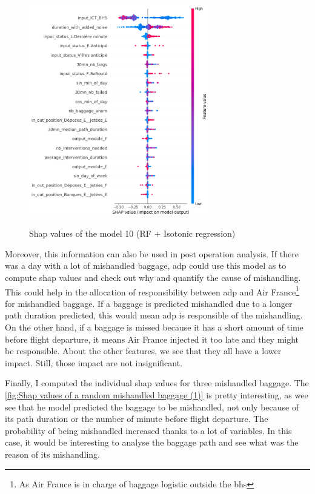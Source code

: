 \documentclass[12pt]{article}
\begin{document}
\FloatBarrier
\begin{figure}[h]
    \centering
    \includegraphics[width=0.7\textwidth]{shap values.png}\\
    \caption{Shap values of the model 10 (RF + Isotonic regression)}
    \label{fig:Shap values}
\end{figure}
\FloatBarrier

Moreover, this information can also be used in post operation analysis. If there was a day with a lot of mishandled baggage, \acrshort{adp} could use this model as to compute shap values and check out why and quantify the cause of mishandling. This could help in the allocation of responsibility between \acrshort{adp} and Air France\footnote{As Air France is in charge of baggage logistic outside the \acrshort{bhs}} for mishandled baggage. If a baggage is predicted mishandled due to a longer path duration predicted, this would mean \acrshort{adp} is responsible of the mishandling. On the other hand, if a baggage is missed because it has a short amount of time before flight departure, it means Air France injected it too late and they might be responsible. About the other features, we see that they all have a lower impact. Still, those impact are not insignificant. \hfill \break

Finally, I computed the individual shap values for three mishandled baggage. The \autoref{fig:Shap values of a random mishandled baggage (1)} is pretty interesting, as wee see that he model predicted the baggage to be mishandled, not only because of its path duration or the number of minute before flight departure. The probability of being mishandled increased thanks to a lot of variables. In this case, it would be interesting to analyse the baggage path and see what was the reason of its mishandling. \hfill \break
\end{document}
